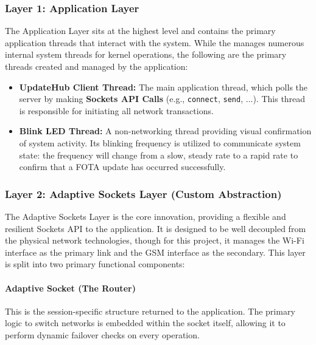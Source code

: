 \subsubsection{Layer 1: Application Layer}
\label{sssec:application_layer}

The Application Layer sits at the highest level and contains the primary application threads that interact with the system. While the  manages numerous internal system threads for kernel operations, the following are the primary threads created and managed by the application:

\begin{itemize}
    \item \textbf{UpdateHub Client Thread:} The main application thread, which polls the  server by making \textbf{Sockets API Calls} (e.g., \texttt{connect}, \texttt{send}, ...). This thread is responsible for initiating all network transactions.
    \item \textbf{Blink LED Thread:} A non-networking thread providing visual confirmation of system activity. Its blinking frequency is utilized to communicate system state: the frequency will change from a slow, steady rate to a rapid rate to confirm that a FOTA update has occurred successfully.
\end{itemize}

\subsubsection{Layer 2: Adaptive Sockets Layer (Custom Abstraction)}
\label{sssec:adaptive_sockets_layer}

The Adaptive Sockets Layer is the core innovation, providing a flexible and resilient Sockets API to the application. It is designed to be well decoupled from the physical network technologies, though for this project, it manages the Wi-Fi interface as the primary link and the GSM interface as the secondary. This layer is split into two primary functional components:

\paragraph{Adaptive Socket (The Router)}
This is the session-specific structure returned to the application. The primary logic to switch networks is embedded within the socket itself, allowing it to perform dynamic failover checks on every operation.

